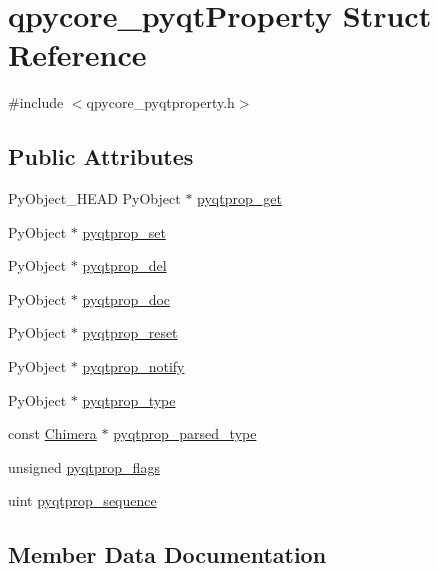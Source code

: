 \hypertarget{structqpycore__pyqtProperty}{}\section{qpycore\+\_\+pyqt\+Property Struct Reference}
\label{structqpycore__pyqtProperty}


{\ttfamily \#include $<$qpycore\+\_\+pyqtproperty.\+h$>$}

\subsection*{Public Attributes}
\begin{DoxyCompactItemize}
\item 
Py\+Object\+\_\+\+H\+E\+A\+D Py\+Object $\ast$ \hyperlink{structqpycore__pyqtProperty_afce88efec3efb5c703f34cbf7f501dad}{pyqtprop\+\_\+get}
\item 
Py\+Object $\ast$ \hyperlink{structqpycore__pyqtProperty_ad47100e9486f2f7617d9d8d14bd7aad0}{pyqtprop\+\_\+set}
\item 
Py\+Object $\ast$ \hyperlink{structqpycore__pyqtProperty_a2d253bec1f4ba7a1a29bfaa832187f9f}{pyqtprop\+\_\+del}
\item 
Py\+Object $\ast$ \hyperlink{structqpycore__pyqtProperty_a7d5e0b02be4b6f1ac945939d8804c3bb}{pyqtprop\+\_\+doc}
\item 
Py\+Object $\ast$ \hyperlink{structqpycore__pyqtProperty_a5974b38d94fb9a7d6e4ec477a40158ff}{pyqtprop\+\_\+reset}
\item 
Py\+Object $\ast$ \hyperlink{structqpycore__pyqtProperty_aa1deb68ecdb5d50081bd52b43a3f83c0}{pyqtprop\+\_\+notify}
\item 
Py\+Object $\ast$ \hyperlink{structqpycore__pyqtProperty_aeb21cfc9f9f22d989935a4c7e97feb60}{pyqtprop\+\_\+type}
\item 
const \hyperlink{classChimera}{Chimera} $\ast$ \hyperlink{structqpycore__pyqtProperty_a329078be39d80de2d8398704e3548d0f}{pyqtprop\+\_\+parsed\+\_\+type}
\item 
unsigned \hyperlink{structqpycore__pyqtProperty_aec162d62f7af7ea37a3ff95e497250d7}{pyqtprop\+\_\+flags}
\item 
uint \hyperlink{structqpycore__pyqtProperty_a1cda0fa6adab793888f736f799afd364}{pyqtprop\+\_\+sequence}
\end{DoxyCompactItemize}


\subsection{Member Data Documentation}
\hypertarget{structqpycore__pyqtProperty_a2d253bec1f4ba7a1a29bfaa832187f9f}{}
